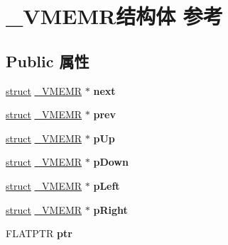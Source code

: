 \hypertarget{struct___v_m_e_m_r}{}\section{\+\_\+\+V\+M\+E\+M\+R结构体 参考}
\label{struct___v_m_e_m_r}
\subsection*{Public 属性}
\begin{DoxyCompactItemize}
\item 
\mbox{\label{struct___v_m_e_m_r_a2a09f620354fcecf0a60df521b8bc9c8}} 
\hyperlink{interfacestruct}{struct} \hyperlink{struct___v_m_e_m_r}{\+\_\+\+V\+M\+E\+MR} $\ast$ {\bfseries next}
\item 
\mbox{\label{struct___v_m_e_m_r_ac1eb49f1eb275f02efc573e2b09a9c63}} 
\hyperlink{interfacestruct}{struct} \hyperlink{struct___v_m_e_m_r}{\+\_\+\+V\+M\+E\+MR} $\ast$ {\bfseries prev}
\item 
\mbox{\label{struct___v_m_e_m_r_aad972ea4aa1995f86dfe9e148f0d24fa}} 
\hyperlink{interfacestruct}{struct} \hyperlink{struct___v_m_e_m_r}{\+\_\+\+V\+M\+E\+MR} $\ast$ {\bfseries p\+Up}
\item 
\mbox{\label{struct___v_m_e_m_r_a01c7076094f15f4876552d5d12d6a13e}} 
\hyperlink{interfacestruct}{struct} \hyperlink{struct___v_m_e_m_r}{\+\_\+\+V\+M\+E\+MR} $\ast$ {\bfseries p\+Down}
\item 
\mbox{\label{struct___v_m_e_m_r_a5a6dc8fb24100baed5f659093bb02e49}} 
\hyperlink{interfacestruct}{struct} \hyperlink{struct___v_m_e_m_r}{\+\_\+\+V\+M\+E\+MR} $\ast$ {\bfseries p\+Left}
\item 
\mbox{\label{struct___v_m_e_m_r_ad2e83782ab5beacfb86aaeb23b442a7f}} 
\hyperlink{interfacestruct}{struct} \hyperlink{struct___v_m_e_m_r}{\+\_\+\+V\+M\+E\+MR} $\ast$ {\bfseries p\+Right}
\item 
\mbox{\label{struct___v_m_e_m_r_a377935e4c52181dc917fdeb507333343}} 
F\+L\+A\+T\+P\+TR {\bfseries ptr}
\item 

\end{DoxyCompactItemize}
